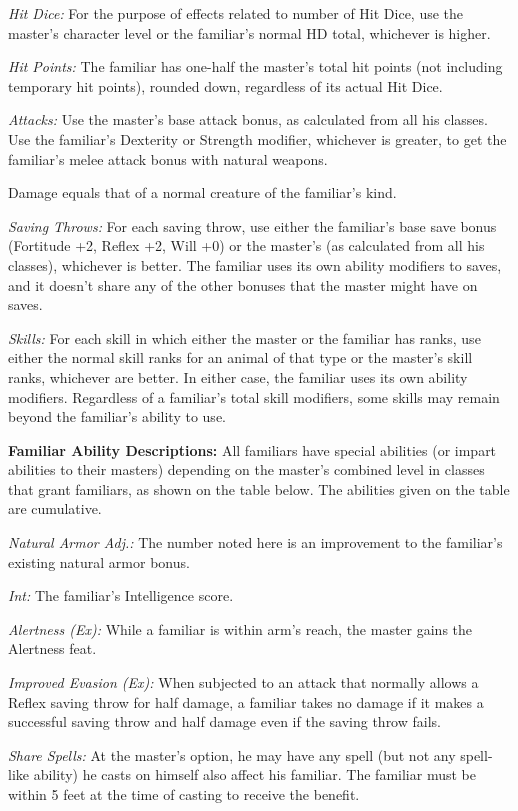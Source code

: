 \textit{Hit Dice:} For the purpose of effects related to number of Hit Dice, use the master's character level or the familiar's normal HD total, whichever is higher.

\textit{Hit Points:} The familiar has one-half the master's total hit points (not including temporary hit points), rounded down, regardless of its actual Hit Dice.

\textit{Attacks:} Use the master's base attack bonus, as calculated from all his classes. Use the familiar's Dexterity or Strength modifier, whichever is greater, to get the familiar's melee attack bonus with natural weapons.

Damage equals that of a normal creature of the familiar's kind.

\textit{Saving Throws:} For each saving throw, use either the familiar's base save bonus (Fortitude +2, Reflex +2, Will +0) or the master's (as calculated from all his classes), whichever is better. The familiar uses its own ability modifiers to saves, and it doesn't share any of the other bonuses that the master might have on saves.

\textit{Skills:} For each skill in which either the master or the familiar has ranks, use either the normal skill ranks for an animal of that type or the master's skill ranks, whichever are better. In either case, the familiar uses its own ability modifiers. Regardless of a familiar's total skill modifiers, some skills may remain beyond the familiar's ability to use.

\textbf{Familiar Ability Descriptions:} All familiars have special abilities (or impart abilities to their masters) depending on the master's combined level in classes that grant familiars, as shown on the table below. The abilities given on the table are cumulative. 

\textit{Natural Armor Adj.:} The number noted here is an improvement to the familiar's existing natural armor bonus.

\textit{Int:} The familiar's Intelligence score.

\textit{Alertness (Ex):} While a familiar is within arm's reach, the master gains the Alertness feat.

\textit{Improved Evasion (Ex):} When subjected to an attack that normally allows a Reflex saving throw for half damage, a familiar takes no damage if it makes a successful saving throw and half damage even if the saving throw fails.

\textit{Share Spells:} At the master's option, he may have any spell (but not any spell-like ability) he casts on himself also affect his familiar. The familiar must be within 5 feet at the time of casting to receive the benefit.

